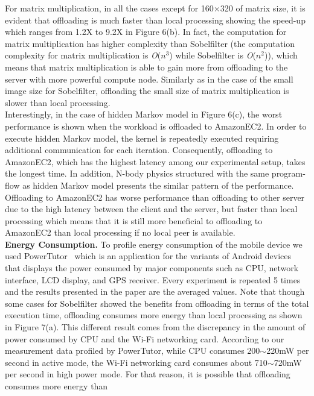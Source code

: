 \documentclass[10pt, conference, compsocconf]{IEEEtran}
\begin{document}
%
\indent For matrix multiplication, in all the cases except for 160$\times$320 of matrix 
size, it is evident that offloading is much faster than local processing 
showing the speed-up which ranges from 1.2X to 9.2X in Figure 6(b).
%
In fact, the computation for matrix multiplication has higher complexity 
than Sobelfilter (the computation complexity for matrix multiplication is
\textit{O}($n^{3}$) 
while Sobelfilter is \textit{O}($n^{2}$)), which means that matrix multiplication is able
to gain more from offloading to the server with more powerful compute node.
%
Similarly as in the case of the small image size for Sobelfilter, offloading
the small size of matrix multiplication is slower than local
processing.\\
%
\indent Interestingly, in the case of hidden Markov model in Figure 6(c), 
the worst performance is shown when the workload is offloaded to AmazonEC2. 
%
In order to execute hidden Markov model, the kernel is repeatedly executed 
requiring additional communication for each iteration.
%
Consequently, offloading to AmazonEC2, which has the highest latency 
among our experimental setup, takes the longest time.
%
In addition, N-body physics structured with the same program-flow as hidden
Markov model presents the similar pattern of the performance.
%
Offloading to AmazonEC2 has worse performance than offloading to other 
server due to the high latency between the client and the server, but faster
than local processing which means that it is still more beneficial to
offloading to AmazonEC2 than local processing if no local peer is
available.\\
%
\indent\textbf{Energy Consumption.}
To profile energy consumption of the mobile device we used
PowerTutor~\cite{powertutor} 
which is an application for the variants of Android devices that displays 
the power consumed by major components such as CPU, network interface, LCD
display, and GPS receiver.
%
Every experiment is repeated 5 times and the results presented in the paper
are the averaged values.
%
Note that though some cases for Sobelfilter showed the benefits from 
offloading in terms of the total execution time, offloading consumes more
energy than local processing as shown in Figure 7(a).
%
This different result comes from the discrepancy in the amount of power 
consumed by CPU and the Wi-Fi networking card.
%
According to our measurement data profiled by PowerTutor, while CPU 
consumes 200$\sim$220mW per second in active mode, the Wi-Fi networking card 
consumes about 710$\sim$720mW per second in high power mode.
%
For that reason, it is possible that offloading consumes more energy than
\end{document}
